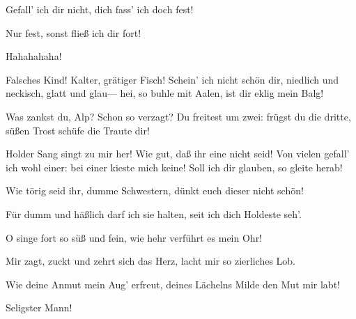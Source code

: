 \begin{drama}

Gefall' ich dir nicht, dich fass' ich doch fest!
 

\Wellgundespeaks


Nur fest, sonst fließ ich dir fort!
 

Hahahahaha!
 

\Alberichspeaks


Falsches Kind! Kalter, grätiger Fisch!
Schein' ich nicht schön dir,
niedlich und neckisch, glatt und glau---
hei, so buhle mit Aalen, ist dir eklig mein Balg!
 

\Flosshildespeaks
Was zankst du, Alp? Schon so verzagt?
Du freitest um zwei: frügst du die dritte,
süßen Trost schüfe die Traute dir!
 

\Alberichspeaks
Holder Sang singt zu mir her!
Wie gut, daß ihr eine nicht seid!
Von vielen gefall' ich wohl einer:
bei einer kieste mich keine!
Soll ich dir glauben, so gleite herab!
 

\Flosshildespeaks


Wie törig seid ihr, dumme Schwestern,
dünkt euch dieser nicht schön!
 

\Alberichspeaks


Für dumm und häßlich darf ich sie halten,
seit ich dich Holdeste seh'.
 

\Flosshildespeaks


O singe fort so süß und fein,
wie hehr verführt es mein Ohr!
 

\Alberichspeaks


Mir zagt, zuckt und zehrt sich das Herz,
lacht mir so zierliches Lob.
 

\Flosshildespeaks


Wie deine Anmut mein Aug' erfreut,
deines Lächelns Milde den Mut mir labt!
 



Seligster Mann!
 


\end{drama}
